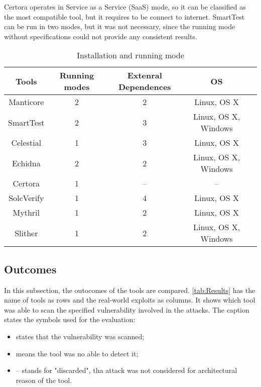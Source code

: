 Certora operates in Service as a Service (SaaS) mode, so it can be classified as the most compatible tool, but it requires to be connect to internet.
SmartTest can be run in two modes, but it was not necessary, since the running mode without specifications could not provide any consistent results.


\begin{center}
    \begin{table*}
        \caption{Installation and running mode}
        \label{tab:Installation}
        \begin{tabular}{ccccc}
        \toprule
            Tools  &  Running modes & Extenral Dependences & OS \\
            \midrule
            Manticore & 2 & 2 & Linux, OS X\\
            SmartTest & 2 & 3 & Linux, OS X, Windows \\
            Celestial & 1 & 3 & Linux, OS X\\
            Echidna & 2 & 2 & Linux, OS X, Windows\\
            Certora & 1 & -- & -- \\ 
            SolcVerify & 1 & 4  &  Linux, OS X \\
            Mythril  & 1 & 2  &  Linux, OS X \\ 
            Slither & 1 & 2 & Linux, OS X, Windows \\   
        \bottomrule
        \end{tabular}
    \end{table*}
\end{center}

\subsection{Outcomes} 
In this subsection, the outocomes of the tools are compared. 
\autoref{tab:Results} has the name of tools as rows and the real-world exploits as columns.
It shows which tool was able to scan the specified vulnerability involved in the attacks. 
The caption states the symbols used for the evaluation:
\begin{itemize}
    \item \checkmark states that the vulnerability was scanned;
    \item \xmark means the tool was no able to detect it;
    \item -- stands for "discarded", tha attack was not considered for architectural reason of the tool.
\end{itemize}


